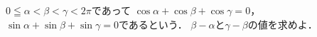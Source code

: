 \documentclass[../../main.tex]{subfiles}
\begin{document}
$0\leqq\alpha<\beta<\gamma<2\pi$であって
$\cos\alpha+\cos\beta+\cos\gamma=0$，$\sin\alpha+\sin\beta+\sin\gamma=0$であるという．
$\beta-\alpha$と$\gamma-\beta$の値を求めよ．
\end{document}
